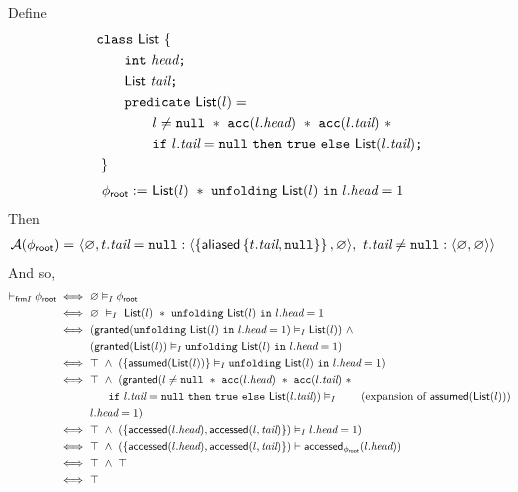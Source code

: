 Define
\begin{align*}
&\hspace{0em} \ttt{class} \ \List \ \{ \\
&\hspace{2em}   \int \ \vhead \ttt{;} \\
&\hspace{2em}   \List \ \vtail \ttt{;} \\
&\hspace{2em}   \ttt{predicate} \ \List(l) = \\
&\hspace{4em}     l \neq \cnull \ \ast \ \cacc(l.\vhead) \ \ast \ \cacc(l.\vtail) \ \ast \\
&\hspace{4em}     \cif \ l.\vtail = \cnull \ \cthen \ \ctrue \ \celse \ \List(l.\vtail) \ttt{;} \\
&\hspace{0em} \ \}
\end{align*}
%
\begin{align*}
{\phi_\textsf{root}} := & \
\textsf{List}(l) \ \ast \ \texttt{unfolding} \ \textsf{List}(l) \ \texttt{in} \ l.\textit{head} = 1
\end{align*}
Then
\begin{align*}
\mathcal{A}({\phi_\textsf{root}}) = & \
\langle  \varnothing ,  t.\textit{tail} = \texttt{null} : \langle  \left\{ \textsf{aliased}\left\{ t.\textit{tail}, \texttt{null} \right\} \right\} , \varnothing \rangle ,\
    t.\textit{tail} \neq \texttt{null} : \langle \varnothing, \varnothing \rangle  \rangle
\end{align*}
And so,
\begin{align*}
\selfframing \phiroot
\iff & \
\empty \frames \phiroot
\\ \iff & \
\empty \ \frames \
\List(l) \ \ast \ \cunfolding \ \List(l) \ \cin \ l.\vhead = 1
\\ \iff & \
( \granted(\cunfolding \ \List(l) \ \cin \ l.\vhead = 1) \frames \List(l) ) \ \land \\ & \
( \granted(\List(l)) \frames \cunfolding \ \List(l) \ \cin \ l.\vhead = 1 )
\\ \iff & \
\top \ \land \ ( \set{ \assumed(\List(l)) } \frames \cunfolding \ \List(l) \ \cin \ l.\vhead = 1 )
\\ \iff & \
\top \ \land \
( \granted(
    l \neq \cnull \ \ast \ \cacc(l.\vhead) \ \ast \ \cacc(l.\vtail) \ \ast \\ & \hspace{2em}
    \cif \ l.\vtail = \cnull \ \cthen \ \ctrue \ \celse \ \List(l.\vtail) )
    \frames
    \tag{expansion of $\assumed(\List(l))$} \\ & \
  l.\vhead = 1 )
\\ \iff & \
\top \ \land \ ( \set{ \accessed(l.\vhead), \accessed(l,\vtail) } ) \frames l.\vhead = 1 )
\\ \iff & \
\top \ \land \ ( \set{ \accessed(l.\vhead), \accessed(l,\vtail) } ) \entails \accessed_{\phiroot}(l.\vhead) )
\\ \iff & \
\top \ \land \ \top
\\ \iff & \
\top
\end{align*}

